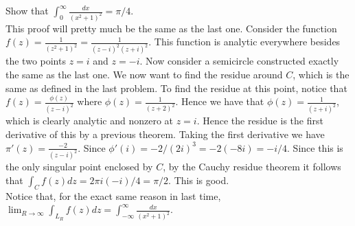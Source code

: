 \documentclass{article}
\theoremstyle{definition}
\begin{document}
 Show that $\int_0^{\infty}\frac{dx}{(x^2 + 1)^2} = \pi/4$.\\

 This proof will pretty much be the same as the last one. Consider the function $f(z) = \frac{1}{(z^2 + 1)^2} = \frac{1}{(z-i)^2(z+ i)^2}$. This function is analytic everywhere besides the two points $z = i$ and $z = -i$. Now consider a semicircle constructed exactly the same as the last one. We now want to find the residue around $C$, which is the same as defined in the last problem. To find the residue at this point, notice that $f(z) = \frac{\phi(z)}{(z-i)^2}$ where $\phi(z) = \frac{1}{(z+2)^2}$. Hence we have that $ \phi(z) = \frac{1}{(z+ i)^2} $, which is clearly analytic and nonzero at $z = i$. Hence the residue is the first derivative of this by a previous theorem. Taking the first derivative we have $\pi'(z) = \frac{-2}{(z-i)^2}$. Since $\phi'(i) = -2/(2i)^3 = -2(-8i) = -i/4$. Since this is the only singular point enclosed by $C$, by the Cauchy residue theorem it follows that $\int_Cf(z)dz = 2\pi i(-i)/4 = \pi/2$. This is good.\\

Notice that, for the exact same reason in last time, $\lim_{R\to \infty}\int_{L_R}f(z)dz = \int_{-\infty}^\infty \frac{dx}{(x^2 + 1)^2}$. 
\end{document}
